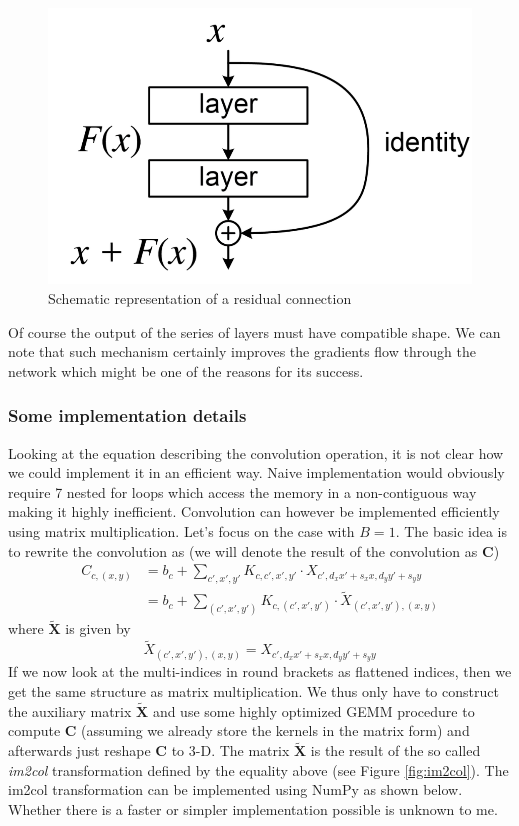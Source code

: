 \documentclass{myclass}
\begin{document}
\begin{figure}[ht]
   \centering
   \includegraphics[width=0.75\columnwidth]{figs/residual.png}
   \caption{Schematic representation of a residual connection}
   \label{fig:residual}
\end{figure}

Of course the output of the series of layers must have compatible shape. We can note that such
mechanism certainly improves the gradients flow through the network which might be one of the
reasons for its success.

\subsubsection{Some implementation details}

Looking at the equation describing the convolution operation, it is not clear how we could implement
it in an efficient way. Naive implementation would obviously require 7 nested for loops which access
the memory in a non-contiguous way making it highly inefficient. Convolution can however be
implemented efficiently using matrix multiplication. Let's focus on the case with $B = 1$. The basic
idea is to rewrite the convolution as (we will denote the result of the convolution as $\bm{C}$)
\[
\begin{split}
   C_{c, (x,y)} & = b_c + \sum_{c',x',y'} K_{c,c',x',y'} \cdot X_{c',d_x x' + s_x x, d_y y' + s_y y} \\
                & = b_c + \sum_{(c',x',y')} K_{c, (c',x',y')} \cdot \tilde{X}_{(c',x',y'), (x,y)}
\end{split}
\]
where $\bm{\tilde{X}}$ is given by
\[
   \tilde{X}_{(c',x',y'), (x,y)} =  X_{c',d_x x' + s_x x, d_y y' + s_y y}
\]
If we now look at the multi-indices in round brackets as flattened indices, then we get the same
structure as matrix multiplication. We thus only have to construct the auxiliary matrix
$\bm{\tilde{X}}$ and use some highly optimized GEMM procedure to compute $\bm{C}$ (assuming we
already store the kernels in the matrix form) and afterwards just reshape $\bm{C}$ to 3-D. The
matrix $\bm{\tilde{X}}$ is the result of the so called \emph{im2col} transformation defined by the
equality above (see Figure \ref{fig:im2col}). The im2col transformation can be implemented using
NumPy as shown below. Whether there is a faster or simpler implementation possible is unknown to me.
\end{document}
